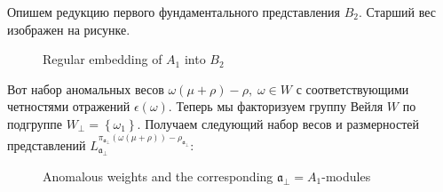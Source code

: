 \documentclass[a4paper,12pt]{article}
\theoremstyle{definition} \newtheorem{Def}{Definition}
\begin{document}
Опишем редукцию первого фундаментального представления $B_2$. Старший вес изображен на рисунке.
\begin{figure}[ph]
  \noindent{}
  \caption{Regular embedding of $A_1$ into $B_2$}
  \label{fig:B2_A1}
\end{figure}
Вот набор аномальных весов $\omega(\mu+\rho)-\rho,\; \omega\in W$ с соответствующими четностями
отражений $\epsilon(\omega)$.
Теперь мы факторизуем группу Вейля $W$ по подгруппе $W_{\bot}=\left\{\omega_1\right\}$. Получаем
следующий набор весов и размерностей представлений  $L^{\pi_{\mathfrak{a}_{\bot}}(\omega(\mu+\rho))-\rho_{\mathfrak{a}_{\bot}}}_{\mathfrak{a}_{\bot}}$:
\begin{figure}[h!tb]
  \noindent{}
  \caption{Anomalous weights and the corresponding $\mathfrak{a}_{\bot}=A_1$-modules}
  \label{fig:B2_A1_2}
\end{figure}
\end{document}
